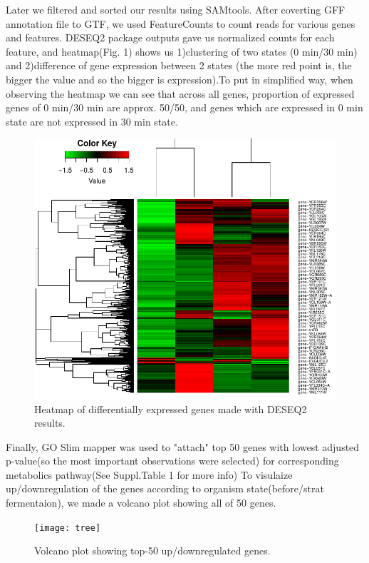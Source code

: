 \documentclass{article}
\begin{document}
 Later we filtered and sorted our results using SAMtools. After coverting GFF annotation file to GTF, we used FeatureCounts to count reads for various genes and features. DESEQ2 package outputs gave us normalized counts for each feature, and heatmap(Fig. 1) shows us 1)clustering of two states (0 min/30 min) and 2)difference of gene expression between 2 states (the more red point is, the bigger the value and so the bigger is expression).To put in simplified way, when observing the heatmap we can see that across all genes, proportion of expressed genes of 0 min/30 min are approx. 50/50, and genes which are expressed in 0 min state are not expressed in 30 min state. 
 
 
  \begin{figure}[h]
 	\centering
 	\includegraphics[scale=1.77]{heatmap}  
 	\caption{ Heatmap of differentially expressed genes made with DESEQ2 results.}
 	\label{heatmap}
 \end{figure}
 
 
 Finally, GO Slim mapper was used to "attach" top 50 genes with lowest adjusted p-value(so the most important observations were selected) for corresponding metabolics pathway(See Suppl.Table 1 for more info)
 To visulaize up/downregulation of the genes according to organism state(before/strat fermentaion), we made a volcano plot showing all of 50 genes.
 
 \begin{figure}[h]
	\centering
	\texttt{[image: tree]}  
	\caption{ Volcano plot showing top-50 up/downregulated genes.}
	\label{tree}
\end{figure}
 
\end{document}
